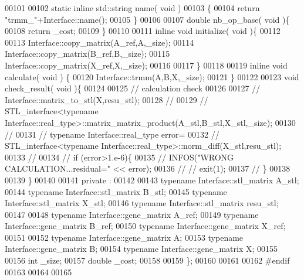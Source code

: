 \begin{DoxyCode}
00101 
00102   \textcolor{keyword}{static} \textcolor{keyword}{inline} std::string name( \textcolor{keywordtype}{void} )
00103   \{
00104     \textcolor{keywordflow}{return} \textcolor{stringliteral}{"trmm\_"}+Interface::name();
00105   \}
00106 
00107   \textcolor{keywordtype}{double} nb\_op\_base( \textcolor{keywordtype}{void} )\{
00108     \textcolor{keywordflow}{return} \_cost;
00109   \}
00110 
00111   \textcolor{keyword}{inline} \textcolor{keywordtype}{void} initialize( \textcolor{keywordtype}{void} )\{
00112 
00113     Interface::copy\_matrix(A\_ref,A,\_size);
00114     Interface::copy\_matrix(B\_ref,B,\_size);
00115     Interface::copy\_matrix(X\_ref,X,\_size);
00116 
00117   \}
00118 
00119   \textcolor{keyword}{inline} \textcolor{keywordtype}{void} calculate( \textcolor{keywordtype}{void} ) \{
00120       Interface::trmm(A,B,X,\_size);
00121   \}
00122 
00123   \textcolor{keywordtype}{void} check\_result( \textcolor{keywordtype}{void} )\{
00124 
00125     \textcolor{comment}{// calculation check}
00126 
00127 \textcolor{comment}{//     Interface::matrix\_to\_stl(X,resu\_stl);}
00128 \textcolor{comment}{//}
00129 \textcolor{comment}{//     STL\_interface<typename Interface::real\_type>::matrix\_matrix\_product(A\_stl,B\_stl,X\_stl,\_size);}
00130 \textcolor{comment}{//}
00131 \textcolor{comment}{//     typename Interface::real\_type error=}
00132 \textcolor{comment}{//       STL\_interface<typename Interface::real\_type>::norm\_diff(X\_stl,resu\_stl);}
00133 \textcolor{comment}{//}
00134 \textcolor{comment}{//     if (error>1.e-6)\{}
00135 \textcolor{comment}{//       INFOS("WRONG CALCULATION...residual=" << error);}
00136 \textcolor{comment}{// //       exit(1);}
00137 \textcolor{comment}{//     \}}
00138 
00139   \}
00140 
00141 private :
00142 
00143   \textcolor{keyword}{typename} Interface::stl\_matrix A\_stl;
00144   \textcolor{keyword}{typename} Interface::stl\_matrix B\_stl;
00145   \textcolor{keyword}{typename} Interface::stl\_matrix X\_stl;
00146   \textcolor{keyword}{typename} Interface::stl\_matrix resu\_stl;
00147 
00148   \textcolor{keyword}{typename} Interface::gene\_matrix A\_ref;
00149   \textcolor{keyword}{typename} Interface::gene\_matrix B\_ref;
00150   \textcolor{keyword}{typename} Interface::gene\_matrix X\_ref;
00151 
00152   \textcolor{keyword}{typename} Interface::gene\_matrix A;
00153   \textcolor{keyword}{typename} Interface::gene\_matrix B;
00154   \textcolor{keyword}{typename} Interface::gene\_matrix X;
00155 
00156   \textcolor{keywordtype}{int} \_size;
00157   \textcolor{keywordtype}{double} \_cost;
00158 
00159 \};
00160 
00161 
00162 \textcolor{preprocessor}{#endif}
00163 
00164 
00165 
\end{DoxyCode}
